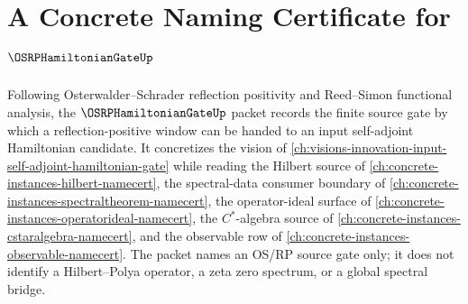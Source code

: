 \chapter{A Concrete Naming Certificate for $\OSRPHamiltonianGateUp$}
\label{ch:concrete-instances-os-rp-hamiltonian-gate-namecert}

Following Osterwalder--Schrader reflection positivity and Reed--Simon functional analysis, the $\OSRPHamiltonianGateUp$ packet records the finite source gate by which a reflection-positive window can be handed to an input self-adjoint Hamiltonian candidate. It concretizes the vision of \autoref{ch:visions-innovation-input-self-adjoint-hamiltonian-gate} while reading the Hilbert source of \autoref{ch:concrete-instances-hilbert-namecert}, the spectral-data consumer boundary of \autoref{ch:concrete-instances-spectraltheorem-namecert}, the operator-ideal surface of \autoref{ch:concrete-instances-operatorideal-namecert}, the $C^*$-algebra source of \autoref{ch:concrete-instances-cstaralgebra-namecert}, and the observable row of \autoref{ch:concrete-instances-observable-namecert}. The packet names an OS/RP source gate only; it does not identify a Hilbert--Polya operator, a zeta zero spectrum, or a global spectral bridge.

